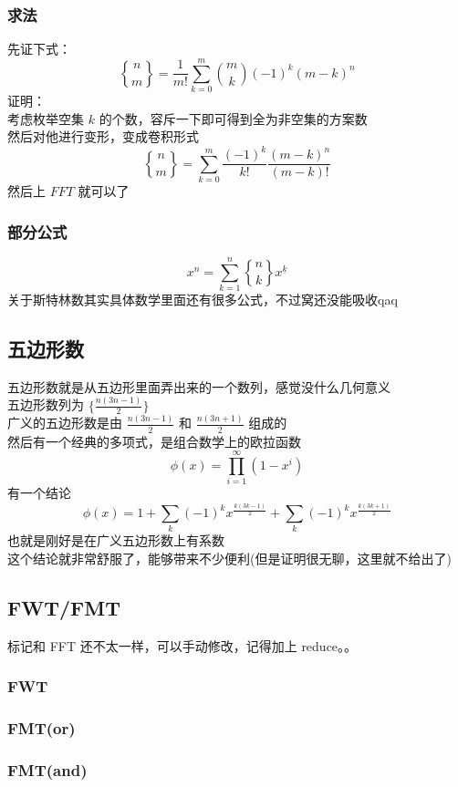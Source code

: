 	\subsubsection{求法}
	先证下式：
	$$
	{n\brace m}=\frac{1}{m!}\sum_{k=0}^m\binom{m}{k}(-1)^k(m-k)^n
	$$
	证明：\\
	考虑枚举空集 $k$ 的个数，容斥一下即可得到全为非空集的方案数\\
	然后对他进行变形，变成卷积形式
	$$
	{n\brace m}=\sum_{k=0}^{m}\frac{(-1)^k}{k!}\frac{(m-k)^n}{(m-k)!}
	$$
	然后上 $FFT$ 就可以了
	\subsubsection{部分公式}
	$$
	x^n=\sum_{k=1}^{n}{n\brace k}x^{\underline{k}}
	$$
	关于斯特林数其实具体数学里面还有很多公式，不过窝还没能吸收qaq
	\newpage
	\subsection{五边形数}
	五边形数就是从五边形里面弄出来的一个数列，感觉没什么几何意义\\
	五边形数列为 $\{\frac{n(3n-1)}{2} \}$\\
	广义的五边形数是由 $\frac{n(3n-1)}{2}$ 和 $\frac{n(3n+1)}{2}$ 组成的\\
	然后有一个经典的多项式，是组合数学上的欧拉函数 
	$$
	\phi(x)=\prod_{i=1}^\infty (1-x^i)
	$$
	有一个结论
	$$
	\phi(x)=1+\sum_k (-1)^kx^{\frac{k(3k-1)}{2} }+\sum_k(-1)^kx^{\frac{k(3k+1)}{2} }
	$$
	也就是刚好是在广义五边形数上有系数\\
	这个结论就非常舒服了，能够带来不少便利(但是证明很无聊，这里就不给出了)
	\newpage
	\subsection{FWT/FMT}
	标记和 FFT 还不太一样，可以手动修改，记得加上 reduce。。\\
	\subsubsection{FWT}
	
	\vspace{1cm}
	\subsubsection{FMT(or)}
	
	\vspace{1cm}
	\subsubsection{FMT(and)}
	
	\newpage
